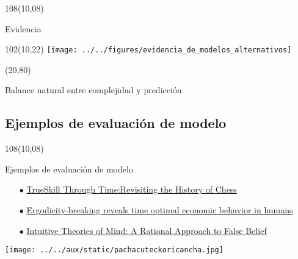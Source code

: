 \documentclass[shownotes]{beamer}
\begin{document}
\begin{frame}
\begin{textblock}{108}(10,08)
 \begin{center}
  \Large  Evidencia
 \end{center}
\end{textblock}


 \begin{textblock}{102}(10,22)
  \centering
  \texttt{[image: ../../figures/evidencia\_de\_modelos\_alternativos]} 
 \end{textblock} 
 
 
 \begin{textblock}{88}(20,80)
  \begin{mdframed}[backgroundcolor=black!15]
\centering
  Balance natural entre complejidad y predicci\'on
  \end{mdframed}
 \end{textblock}
\end{frame}

\subsection{Ejemplos de evaluaci\'on de modelo}
\begin{frame}
\begin{textblock}{108}(10,08)
 \begin{center}
  \large Ejemplos de evaluaci\'on de modelo
 \end{center}
\end{textblock}
 
\begin{itemize}
 \item[$\bullet$] \href{https://papers.nips.cc/paper/3331-trueskill-through-time-revisiting-the-history-of-chess.pdf}{TrueSkill Through Time:Revisiting the History of Chess} \pause
 \item[$\bullet$] \href{https://arxiv.org/pdf/1906.04652.pdf}{Ergodicity-breaking reveals time optimal economic behavior in humans} \pause
 \item[$\bullet$] \href{https://web.mit.edu/cocosci/Papers/pos785-goodman.pdf}{Intuitive Theories of Mind: A Rational Approach to False Belief}
\end{itemize}
 
\end{frame}










\begin{frame}[plain]

\centering
  \texttt{[image: ../../aux/static/pachacuteckoricancha.jpg]}
\end{frame}
\end{document}
